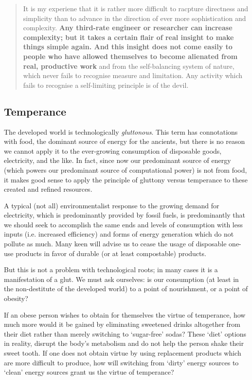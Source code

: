 \documentclass[letterpaper]{article}
\begin{document}
\begin{quote}
  It is my experiene that it is rather more difficult to racpture directness and simplicity than to advance in the direction of ever more sophistication and complexity. \textbf{Any third-rate engineer or researcher can increase complexity; but it takes a certain flair of real insight to make things simple again. And this insight does not come easily to people who have allowed themselves to become alienated from real, productive work} and from the self-balancing system of nature, which never fails to recognise measure and limitation. Any activity which fails to recognise a self-limiting principle is of the devil.
\end{quote}

\subsection{Temperance}

The developed world is technologically \textit{gluttonous}. This term has connotations with food, the dominant source of energy for the ancients, but there is no reason we cannot apply it to the ever-growing consumption of disposable goods, electricity, and the like. In fact, since now our predominant source of energy (which powers our predominant source of computational power) is not from food, it makes good sense to apply the principle of gluttony versus temperance to these created and refined resources.

A typical (not all) environmentalist response to the growing demand for electricity, which is predominantly provided by fossil fuels, is predominantly that we should seek to accomplish the same ends and levels of consumption with less inputs (i.e. increased efficiency) and forms of energy generation which do not pollute as much. Many keen will advise us to cease the usage of disposable one-use products in favor of durable (or at least compostable) products.

But this is not a problem with technological roots; in many cases it is a manifestation of a glut. We must ask ourselves: is our consumption (at least in the non-destitute of the developed world) to a point of nourishment, or a point of obesity?

If an obese person wishes to obtain for themselves the virtue of temperance, how much more would it be gained by eliminating sweetened drinks altogether from their diet rather than merely switching to `sugar-free' sodas? These `diet' options in reality, disrupt the body's metabolism and do not help the person shake their sweet tooth. If one does not obtain virtue by using replacement products which are more difficult to produce, how will switching from `dirty' energy sources to `clean' energy sources grant us the virtue of temperance?
\end{document}
